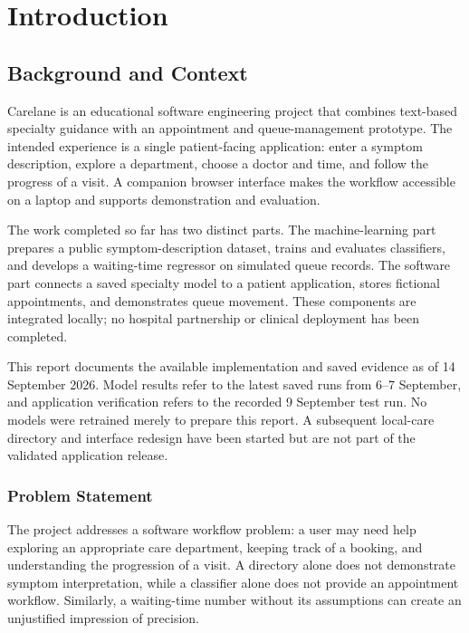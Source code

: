 \documentclass{tietreport}
\author{Pranshu Sharma \quad {\small [Roll number]}\\[0.12cm]
Shashwat Mishra \quad {\small [Roll number]}\\[0.12cm]
Mayank Kalra \quad {\small [Roll number]}}
\begin{document}
\maketitle
\tableofcontents

\chapter{Introduction}
\section{Background and Context}
Carelane is an educational software engineering project that combines text-based specialty guidance with an appointment and queue-management prototype. The intended experience is a single patient-facing application: enter a symptom description, explore a department, choose a doctor and time, and follow the progress of a visit. A companion browser interface makes the workflow accessible on a laptop and supports demonstration and evaluation.

The work completed so far has two distinct parts. The machine-learning part prepares a public symptom-description dataset, trains and evaluates classifiers, and develops a waiting-time regressor on simulated queue records. The software part connects a saved specialty model to a patient application, stores fictional appointments, and demonstrates queue movement. These components are integrated locally; no hospital partnership or clinical deployment has been completed.

This report documents the available implementation and saved evidence as of 14 September 2026. Model results refer to the latest saved runs from 6--7 September, and application verification refers to the recorded 9 September test run. No models were retrained merely to prepare this report. A subsequent local-care directory and interface redesign have been started but are not part of the validated application release.

\subsection{Problem Statement}
The project addresses a software workflow problem: a user may need help exploring an appropriate care department, keeping track of a booking, and understanding the progression of a visit. A directory alone does not demonstrate symptom interpretation, while a classifier alone does not provide an appointment workflow. Similarly, a waiting-time number without its assumptions can create an unjustified impression of precision.
\end{document}
